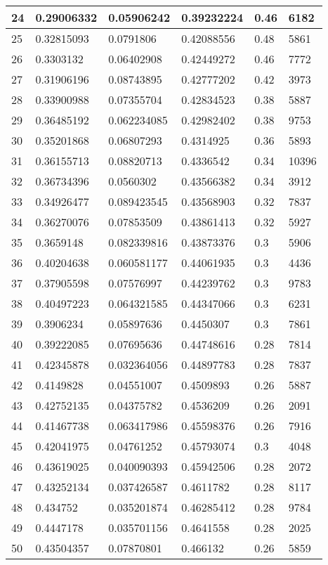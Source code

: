 \begin{longtable}{|l|l|l|l|l|l|}
24 & 0.29006332 & 0.05906242 & 0.39232224 & 0.46 & 6182 \\ \hline 
25 & 0.32815093 & 0.0791806 & 0.42088556 & 0.48 & 5861 \\ \hline 
26 & 0.3303132 & 0.06402908 & 0.42449272 & 0.46 & 7772 \\ \hline 
27 & 0.31906196 & 0.08743895 & 0.42777202 & 0.42 & 3973 \\ \hline 
28 & 0.33900988 & 0.07355704 & 0.42834523 & 0.38 & 5887 \\ \hline 
29 & 0.36485192 & 0.062234085 & 0.42982402 & 0.38 & 9753 \\ \hline 
30 & 0.35201868 & 0.06807293 & 0.4314925 & 0.36 & 5893 \\ \hline 
31 & 0.36155713 & 0.08820713 & 0.4336542 & 0.34 & 10396 \\ \hline 
32 & 0.36734396 & 0.0560302 & 0.43566382 & 0.34 & 3912 \\ \hline 
33 & 0.34926477 & 0.089423545 & 0.43568903 & 0.32 & 7837 \\ \hline 
34 & 0.36270076 & 0.07853509 & 0.43861413 & 0.32 & 5927 \\ \hline 
35 & 0.3659148 & 0.082339816 & 0.43873376 & 0.3 & 5906 \\ \hline 
36 & 0.40204638 & 0.060581177 & 0.44061935 & 0.3 & 4436 \\ \hline 
37 & 0.37905598 & 0.07576997 & 0.44239762 & 0.3 & 9783 \\ \hline 
38 & 0.40497223 & 0.064321585 & 0.44347066 & 0.3 & 6231 \\ \hline 
39 & 0.3906234 & 0.05897636 & 0.4450307 & 0.3 & 7861 \\ \hline 
40 & 0.39222085 & 0.07695636 & 0.44748616 & 0.28 & 7814 \\ \hline 
41 & 0.42345878 & 0.032364056 & 0.44897783 & 0.28 & 7837 \\ \hline 
42 & 0.4149828 & 0.04551007 & 0.4509893 & 0.26 & 5887 \\ \hline 
43 & 0.42752135 & 0.04375782 & 0.4536209 & 0.26 & 2091 \\ \hline 
44 & 0.41467738 & 0.063417986 & 0.45598376 & 0.26 & 7916 \\ \hline 
45 & 0.42041975 & 0.04761252 & 0.45793074 & 0.3 & 4048 \\ \hline 
46 & 0.43619025 & 0.040090393 & 0.45942506 & 0.28 & 2072 \\ \hline 
47 & 0.43252134 & 0.037426587 & 0.4611782 & 0.28 & 8117 \\ \hline 
48 & 0.434752 & 0.035201874 & 0.46285412 & 0.28 & 9784 \\ \hline 
49 & 0.4447178 & 0.035701156 & 0.4641558 & 0.28 & 2025 \\ \hline 
50 & 0.43504357 & 0.07870801 & 0.466132 & 0.26 & 5859 \\ \hline 
\end{longtable}